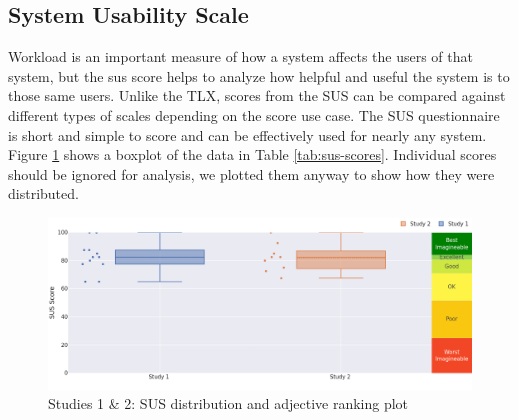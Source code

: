 \documentclass[thesis]{fputhesis}
\newcommand{\ra}[1]{\renewcommand{\arraystretch}{#1}}
\begin{document}
\begin{body}
\section{System Usability Scale}
Workload is an important measure of how a system affects the users of that system, but the \acrfull{sus} score helps to analyze how helpful and useful the system is to those same users. Unlike the TLX, scores from the SUS can be compared against different types of scales depending on the score use case. The SUS questionnaire is short and simple to score and can be effectively used for nearly any system. Figure \ref{fig:sus-plot} shows a boxplot of the data in Table \ref{tab:sus-scores}. Individual scores should be ignored for analysis, we plotted them anyway to show how they were distributed.

\begin{figure}[h]
    \centering
    \includegraphics[width=\textwidth]{Images/main_plot.png}
    \caption{Studies 1 \& 2: SUS distribution and adjective ranking plot}
    \label{fig:sus-plot}
\end{figure}

\begin{table}[h]\centering
\caption{Studies 1 \& 2: SUS statistics}\label{tab:sus-scores}
\ra{1.2}
\end{table}


\end{body}
\end{document}
